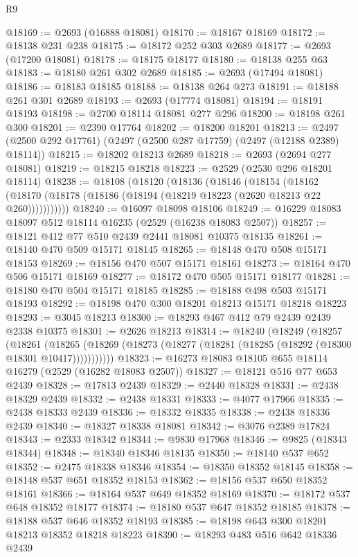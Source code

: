 \begin{lexlean}{R9}
\begin{coremodule}
@18169 := @2693 (@16888 @18081)
@18170 := @18167 @18169
@18172 := @18138 @231 @238
@18175 := @18172 @252 @303 @2689
@18177 := @2693 (@17200 @18081)
@18178 := @18175 @18177
@18180 := @18138 @255 @63
@18183 := @18180 @261 @302 @2689
@18185 := @2693 (@17494 @18081)
@18186 := @18183 @18185
@18188 := @18138 @264 @273
@18191 := @18188 @261 @301 @2689
@18193 := @2693 (@17774 @18081)
@18194 := @18191 @18193
@18198 := @2700 @18114 @18081 @277 @296
@18200 := @18198 @261 @300
@18201 := @2390 @17764
@18202 := @18200 @18201
@18213 := @2497 (@2500 @292 @17761) (@2497 (@2500 @287 @17759) (@2497 (@12188 @2389) @18114))
@18215 := @18202 @18213 @2689
@18218 := @2693 (@2694 @277 @18081)
@18219 := @18215 @18218
@18223 := @2529 (@2530 @296 @18201 @18114)
@18238 := @18108
    (@18120
      (@18136
        (@18146
          (@18154
            (@18162 (@18170 (@18178 (@18186 (@18194 (@18219 @18223 (@2620 @18213 @22 @260)))))))))))
@18240 := @16097 @18098 @18106
@18249 := @16229 @18083 @18097 @512 @18114 @16235 (@2529 (@16238 @18083 @2507))
@18257 := @18121 @412 @77 @510 @2439 @2441 @18081 @10375 @18135
@18261 := @18140 @470 @509 @15171 @18145
@18265 := @18148 @470 @508 @15171 @18153
@18269 := @18156 @470 @507 @15171 @18161
@18273 := @18164 @470 @506 @15171 @18169
@18277 := @18172 @470 @505 @15171 @18177
@18281 := @18180 @470 @504 @15171 @18185
@18285 := @18188 @498 @503 @15171 @18193
@18292 := @18198 @470 @300 @18201 @18213 @15171 @18218 @18223
@18293 := @3045 @18213
@18300 := @18293 @467 @412 @79 @2439 @2439 @2338 @10375
@18301 := @2626 @18213
@18314 := @18240
    (@18249
      (@18257
        (@18261
          (@18265 (@18269 (@18273 (@18277 (@18281 (@18285 (@18292 (@18300 @18301 @10417)))))))))))
@18323 := @16273 @18083 @18105 @655 @18114 @16279 (@2529 (@16282 @18083 @2507))
@18327 := @18121 @516 @77 @653 @2439
@18328 := @17813 @2439
@18329 := @2440 @18328
@18331 := @2438 @18329 @2439
@18332 := @2438 @18331
@18333 := @4077 @17966
@18335 := @2438 @18333 @2439
@18336 := @18332 @18335
@18338 := @2438 @18336 @2439
@18340 := @18327 @18338 @18081
@18342 := @3076 @2389 @17824
@18343 := @2333 @18342
@18344 := @9830 @17968
@18346 := @9825 (@18343 @18344)
@18348 := @18340 @18346 @18135
@18350 := @18140 @537 @652
@18352 := @2475 @18338 @18346
@18354 := @18350 @18352 @18145
@18358 := @18148 @537 @651 @18352 @18153
@18362 := @18156 @537 @650 @18352 @18161
@18366 := @18164 @537 @649 @18352 @18169
@18370 := @18172 @537 @648 @18352 @18177
@18374 := @18180 @537 @647 @18352 @18185
@18378 := @18188 @537 @646 @18352 @18193
@18385 := @18198 @643 @300 @18201 @18213 @18352 @18218 @18223
@18390 := @18293 @483 @516 @642 @18336 @2439

\end{coremodule}
\end{lexlean}
